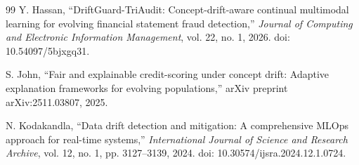 \begin{thebibliography}{99}
Y. Hassan, ``DriftGuard-TriAudit: Concept-drift-aware continual multimodal learning for evolving financial statement fraud detection,'' \textit{Journal of Computing and Electronic Information Management}, vol. 22, no. 1, 2026. doi: 10.54097/5bjxgq31.

S. John, ``Fair and explainable credit-scoring under concept drift: Adaptive explanation frameworks for evolving populations,'' arXiv preprint arXiv:2511.03807, 2025.

N. Kodakandla, ``Data drift detection and mitigation: A comprehensive MLOps approach for real-time systems,'' \textit{International Journal of Science and Research Archive}, vol. 12, no. 1, pp. 3127--3139, 2024. doi: 10.30574/ijsra.2024.12.1.0724.
\end{thebibliography}
